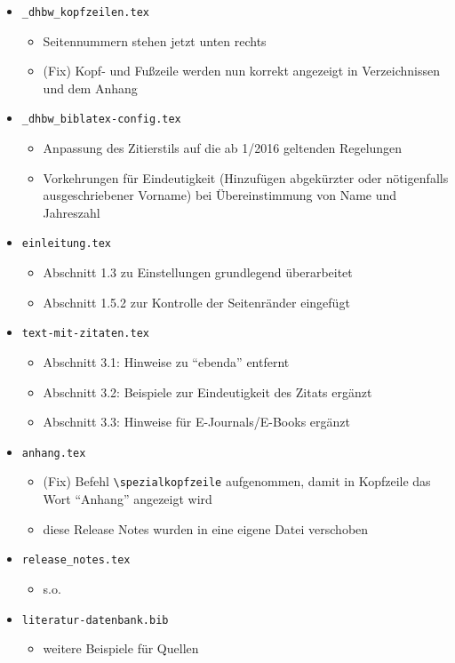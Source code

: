 \begin{itemize}
\item \verb|_dhbw_kopfzeilen.tex|
\begin{itemize}
\item Seitennummern stehen jetzt unten rechts
\item (Fix) Kopf- und Fußzeile werden nun korrekt angezeigt in Verzeichnissen und dem Anhang
\end{itemize}

\item \verb|_dhbw_biblatex-config.tex|
\begin{itemize}
\item Anpassung des Zitierstils auf die ab 1/2016 geltenden Regelungen  
\item Vorkehrungen für Eindeutigkeit (Hinzufügen abgekürzter oder nötigenfalls ausgeschriebener Vorname) bei Übereinstimmung von Name und Jahreszahl 
\end{itemize}

\item \verb|einleitung.tex|
\begin{itemize}
\item Abschnitt 1.3 zu Einstellungen grundlegend überarbeitet
\item Abschnitt 1.5.2 zur Kontrolle der Seitenränder eingefügt 
\end{itemize}

\item \verb|text-mit-zitaten.tex|
\begin{itemize}
\item Abschnitt 3.1: Hinweise zu \enquote{ebenda} entfernt
\item Abschnitt 3.2: Beispiele zur Eindeutigkeit des Zitats ergänzt
\item Abschnitt 3.3: Hinweise für E-Journals/E-Books ergänzt 
\end{itemize}

\item \verb|anhang.tex|
\begin{itemize}
\item (Fix) Befehl \verb|\spezialkopfzeile| aufgenommen, damit in Kopfzeile das Wort \enquote{Anhang} angezeigt wird 
\item diese Release Notes wurden in eine eigene Datei verschoben
\end{itemize}

\item \verb|release_notes.tex|
\begin{itemize}
\item s.o.
\end{itemize}


\item \verb|literatur-datenbank.bib|
\begin{itemize}
\item weitere Beispiele für Quellen
\end{itemize}
\end{itemize}

